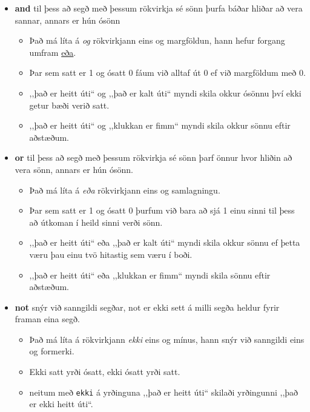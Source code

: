 \begin{itemize}
	\item[] \textbf{and} til þess að segð með þessum rökvirkja sé sönn þurfa báðar hliðar að vera sannar, annars er hún ósönn
	\begin{itemize}
		\item Það má líta á \textit{og} rökvirkjann eins og margföldun, hann hefur forgang umfram \underline{eða}.
		\item Þar sem satt er 1 og ósatt 0 fáum við alltaf út 0 ef við margföldum með 0.
		\item ,,það er heitt úti“ og ,,það er kalt úti“ myndi skila okkur ósönnu því ekki getur bæði verið satt.
		\item ,,það er heitt úti“ og ,,klukkan er fimm“ myndi skila okkur sönnu eftir aðstæðum.
	\end{itemize}
	\item[] \textbf{or} til þess að segð með þessum rökvirkja sé sönn þarf önnur hvor hliðin að vera sönn, annars er hún ósönn.
	\begin{itemize}
		\item Það má líta á \textit{eða} rökvirkjann eins og samlagningu.
		\item Þar sem satt er 1 og ósatt 0 þurfum við bara að sjá 1 einu sinni til þess að útkoman í heild sinni verði sönn.
		\item ,,það er heitt úti“ eða ,,það er kalt úti“ myndi skila okkur sönnu ef þetta væru þau einu tvö hitastig sem væru í boði.
		\item ,,það er heitt úti“ eða ,,klukkan er fimm“ myndi skila sönnu eftir aðstæðum.
	\end{itemize}
	\item[] \textbf{not} snýr við sanngildi segðar, not er ekki sett á milli segða heldur fyrir framan eina segð.
	\begin{itemize}
		\item Það má líta á rökvirkjann \textit{ekki} eins og mínus, hann snýr við sanngildi eins og formerki.
		\item Ekki satt yrði ósatt, ekki ósatt yrði satt.
		\item neitum með \texttt{ekki} á yrðinguna ,,það er heitt úti“ skilaði yrðingunni ,,það er ekki heitt úti“.
	\end{itemize}
\end{itemize}

